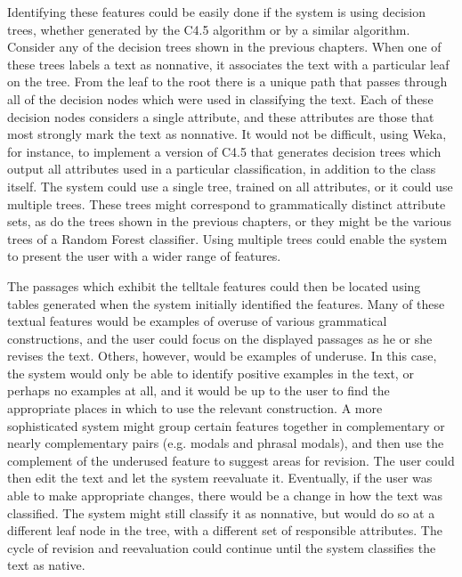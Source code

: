 \documentclass[main.tex]{subfiles}
\begin{document}
Identifying these features could be easily done if the system is using decision trees, whether generated by the C4.5 algorithm or by a similar algorithm. Consider any of the decision trees shown in the previous chapters. When one of these trees labels a text as nonnative, it associates the text with a particular leaf on the tree. From the leaf to the root there is a unique path that passes through all of the decision nodes which were used in classifying the text. Each of these decision nodes considers a single attribute, and these attributes are those that most strongly mark the text as nonnative. It would not be difficult, using Weka, for instance, to implement a version of C4.5 that generates decision trees which output all attributes used in a particular classification, in addition to the class itself. The system could use a single tree, trained on all attributes, or it could use multiple trees. These trees might correspond to grammatically distinct attribute sets, as do the trees shown in the previous chapters, or they might be the various trees of a Random Forest classifier. Using multiple trees could enable the system to present the user with a wider range of features.

The passages which exhibit the telltale features could then be located using tables generated when the system initially identified the features. Many of these textual features would be examples of overuse of various grammatical constructions, and the user could focus on the displayed passages as he or she revises the text. Others, however, would be examples of underuse. In this case, the system would only be able to identify positive examples in the text, or perhaps no examples at all, and it would be up to the user to find the appropriate places in which to use the relevant construction. A more sophisticated system might group certain features together in complementary or nearly complementary pairs (e.g. modals and phrasal modals), and then use the complement of the underused feature to suggest areas for revision. The user could then edit the text and let the system reevaluate it. Eventually, if the user was able to make appropriate changes, there would be a change in how the text was classified. The system might still classify it as nonnative, but would do so at a different leaf node in the tree, with a different set of responsible attributes. The cycle of revision and reevaluation could continue until the system classifies the text as native.




\biblio
\end{document}
